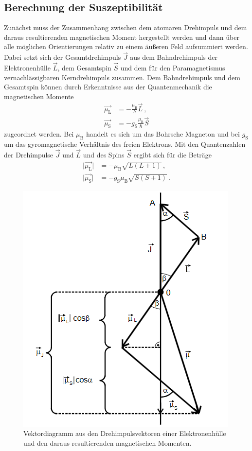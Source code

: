 \subsection{Berechnung der Suszeptibilität}
Zunächst muss der Zusammenhang zwischen dem atomaren Drehimpuls und dem daraus resultierenden magnetischen Moment hergestellt werden und dann über alle möglichen Orientierungen relativ zu einem äußeren
Feld aufsummiert werden. Dabei setzt sich der Gesamtdrehimpuls $\vec{J}$ aus dem Bahndrehimpuls der Elektronenhülle $\vec{L}$, dem Gesamtspin $\vec{S}$ und dem für den Paramagnetismus vernachlässigbaren Kerndrehimpuls zusammen.
Dem Bahndrehimpuls und dem Gesamtspin können durch Erkenntnisse aus der Quantenmechanik die magnetischen Momente
\begin{align}
    \vec{\mu_\text{L}} &= - \frac{\mu_\text{B}}{\hbar} \vec{L} \ , \\
    \vec{\mu_\text{S}} &= - g_\text{S}\frac{\mu_\text{B}}{\hbar} \vec{S}
\end{align} 
zugeordnet werden. Bei $\mu_\text{B}$ handelt es sich um das Bohrsche Magneton und bei $g_\text{S}$ um das gyromagnetische Verhältnis des freien Elektrons.
Mit den Quantenzahlen der Drehimpulse $\vec{J}$ und $\vec{L}$ und des Spins $\vec{S}$ ergibt sich für die Beträge
\begin{align}
    \lvert \vec{\mu_\text{L}} \rvert &= - \mu_\text{B} \sqrt{L\left(L+1\right)} \, , \\
    \lvert \vec{\mu_\text{S}} \rvert &= - g_\text{S} \mu_\text{B} \sqrt{S\left(S+1\right)} \, .
\end{align}
\begin{figure}
    \centering
    \includegraphics[scale=0.4]{pics/Vektor.png}
    \caption{Vektordiagramm aus den Drehimpulsvektoren einer Elektronenhülle und den daraus resultierenden magnetischen Momenten. \cite{v606}}
    \label{fig:VE}
  \end{figure}
